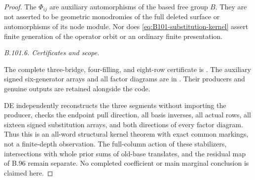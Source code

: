 \begin{proof}
The $\Phi_{ij}$ are auxiliary automorphisms of the based free group
$B$.  They are not asserted to be geometric monodromies of the
full deleted surface or automorphisms of its node module.
Nor does \eqref{eq:B101-substitution-kernel} assert finite generation
of the operator orbit or an ordinary finite presentation.

\emph{B.101.6. Certificates and scope.}
{\raggedright
The complete three-bridge, four-filling, and eight-row certificate is
.
The auxiliary signed six-generator arrays and all factor diagrams are in
.
Their producers and genuine outputs are retained alongside the code.\par}
DE independently reconstructs the three segments without importing
the producer, checks the endpoint pull direction, all basis inverses,
all actual rows, all sixteen signed substitution arrays, and both
directions of every factor diagram.
Thus this is an all-word structural kernel theorem with exact
common markings, not a finite-depth observation.
The full-column action of these stabilizers, intersections with
whole prior sums of old-base translates, and the residual map of
B.96 remain separate.  No completed coefficient or main marginal
conclusion is claimed here.
\end{proof}
